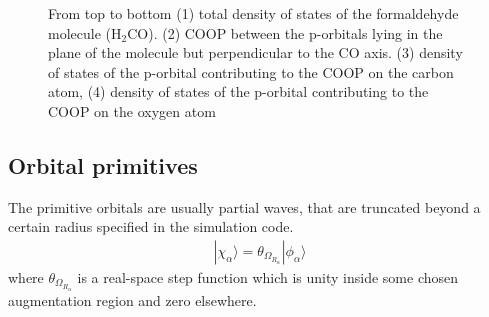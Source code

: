 \documentclass[final,12pt]{article}
\begin{document}
{{{{{{\begin{figure}
\centerline{
}
 \caption{From top to bottom (1) total density of states of the 
   formaldehyde molecule (H$_2$CO). (2) COOP between the p-orbitals
   lying in the plane of the molecule but perpendicular to the CO
   axis. (3) density of states of the p-orbital contributing to the
   COOP on the carbon atom, (4) density of states of the p-orbital
   contributing to the COOP on the oxygen atom}
\label{fig:h2copdos}
\end{figure}


\subsection{Orbital primitives}
\label{sec:dostoolorbitalprimitives}
The primitive orbitals are usually partial waves, that are truncated
beyond a certain radius specified in the simulation code.  
\begin{eqnarray}
|\chi_\alpha\rangle=\theta_{\Omega_{R_\alpha}}|\phi_\alpha\rangle
\end{eqnarray}
where $\theta_{\Omega_{R_\alpha}}$ is a real-space step function which is
unity inside some chosen augmentation region and zero elsewhere.  

}}}}}}
\end{document}

